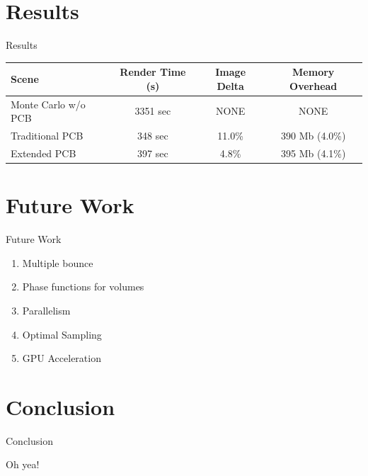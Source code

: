\documentclass[10pt,handout,compress,professionalfont]{beamer}
\begin{document}
\section{Results}
\begin{frame}{Results}

    \begin{center}
    \setlength{\tabcolsep}{5pt}
    \begin{tabular}{ | l | c | c | c | }
      \hline                       
      Scene & Render Time (s) & Image Delta & Memory Overhead \\
      \hline                  
      Monte Carlo w/o PCB & 3351 sec & NONE & NONE \\
      Traditional PCB & 348 sec & 11.0\% & 390 Mb (4.0\%) \\
      Extended PCB & 397 sec & 4.8\% & 395 Mb (4.1\%)  \\
      \hline  
    \end{tabular}
    \end{center}

\end{frame}




\section{Future Work}
\begin{frame}{Future Work}

    \begin{enumerate}
        \item Multiple bounce
        \item Phase functions for volumes
        \item Parallelism
        \item Optimal Sampling
        \item GPU Acceleration
    \end{enumerate}

\end{frame}




\section{Conclusion}
\begin{frame}{Conclusion}

    Oh yea!

\end{frame}
\end{document}

